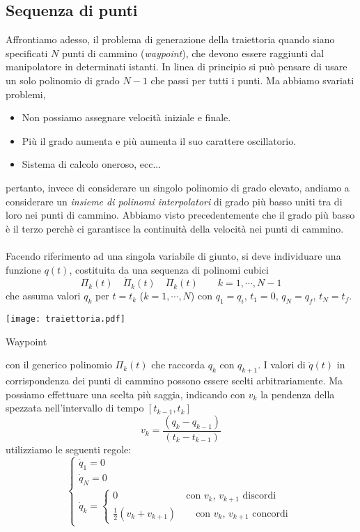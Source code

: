 \subsection{Sequenza di punti}
Affrontiamo adesso, il problema di generazione della traiettoria quando siano specificati $N$ punti di cammino (\emph{waypoint}), che devono essere raggiunti dal manipolatore in determinati istanti. In linea di principio si può pensare di usare un solo polinomio di grado $N-1$ che passi per tutti i punti. Ma abbiamo svariati problemi,
\begin{itemize}
	\item Non possiamo assegnare velocità iniziale e finale.
	\item Più il grado aumenta e più aumenta il suo carattere oscillatorio.
	\item Sistema di calcolo oneroso, ecc...
\end{itemize}
pertanto, invece di considerare un singolo polinomio di grado elevato, andiamo a considerare un \emph{insieme di polinomi interpolatori} di grado più basso uniti tra di loro nei punti di cammino. Abbiamo visto precedentemente che il grado più basso è il terzo perchè ci garantisce la continuità della velocità nei punti di cammino.

\paragraph{} 
Facendo riferimento ad una singola variabile di giunto, si deve individuare una funzione $q(t)$, costituita da una sequenza di polinomi cubici
\begin{equation}
	\Pi_k(t) \quad \dot{\Pi}_k(t) \quad \ddot{\Pi}_k(t) \qquad  k = 1, \cdots, N-1
\end{equation}
che assuma valori $q_k$ per $t = t_k$ ($k = 1, \cdots, N$) con $q_1 = q_i$, $t_1 = 0$, $q_N = q_f$, $t_N = t_f$. 
\begin{center}
	\texttt{[image: traiettoria.pdf]}
	\caption{Waypoint}
\end{center}
con il generico polinomio $\Pi_k(t)$ che raccorda $q_k$ con $q_{k+1}$. I valori di $\dot{q}(t)$ in corrispondenza dei punti di cammino possono essere scelti arbitrariamente. Ma possiamo effettuare una scelta più saggia, indicando con $v_k$ la pendenza della spezzata nell'intervallo di tempo $[t_{k-1}, t_k]$
\begin{equation}
	v_k = \frac{(q_k - q_{k-1})}{(t_k - t_{k-1})}
\end{equation}
utilizziamo le seguenti regole:
\begin{equation}
	\begin{cases}
		\dot{q}_1 = 0 \\
		\dot{q}_N = 0 \\
		\dot{q}_k = 
		\begin{cases}
			0 \qquad \qquad \qquad \quad \text{con $v_k$, $v_{k+1}$ discordi} \\
			\frac{1}{2} (v_k + v_{k+1}) \qquad \text{con $v_k$, $v_{k+1}$ concordi}
		\end{cases}
	\end{cases}
\end{equation}


